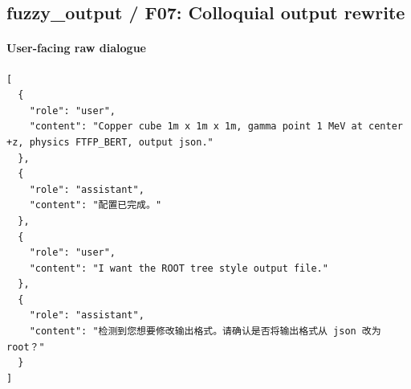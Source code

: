 \documentclass[11pt]{ctexart}
\begin{document}
\subsection{fuzzy\_output / F07: Colloquial output rewrite}
\paragraph{User-facing raw dialogue}
\begin{lstlisting}
[
  {
    "role": "user",
    "content": "Copper cube 1m x 1m x 1m, gamma point 1 MeV at center +z, physics FTFP_BERT, output json."
  },
  {
    "role": "assistant",
    "content": "配置已完成。"
  },
  {
    "role": "user",
    "content": "I want the ROOT tree style output file."
  },
  {
    "role": "assistant",
    "content": "检测到您想要修改输出格式。请确认是否将输出格式从 json 改为 root？"
  }
]
\end{lstlisting}
\end{document}
